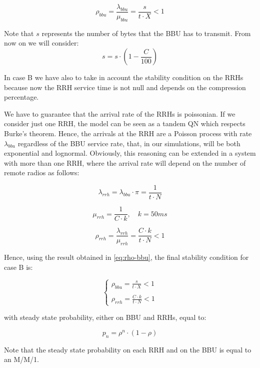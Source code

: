 \documentclass[11pt,a4paper,oneside, openright]{article}
\begin{document}
\begin{equation} \label{eq:rho-bbu}
\rho_{bbu} = \frac{\lambda_{bbu}}{\mu_{bbu}} = \frac{s}{t \cdot X} < 1
\end{equation}

Note that $s$ represents the number of bytes that the BBU has to transmit. From now on we will consider:
$$s = s\cdot(1-\frac{C}{100})$$

In case B we have also to take in account the stability condition on the RRHs because now the RRH service time is not null and depends on the compression percentage. 

We have to guarantee that the arrival rate of the RRHs is poissonian. If we consider just one RRH, the model can be seen as a tandem QN which respects Burke's theorem. Hence, the arrivals at the RRH are a Poisson process with rate $ \lambda_{bbu} $ regardless of the BBU service rate, that, in our simulations, will be both exponential and lognormal. 
Obviously, this reasoning can be extended in a system with more than one RRH, where the arrival rate will depend on the number of remote radios as follows:

$$ \lambda_{rrh} = \lambda_{bbu} \cdot \pi = \frac{1}{t \cdot N} $$

$$ \mu_{rrh} = \frac{1}{C \cdot k}, \quad k = 50ms $$

\begin{equation} \label{eq:rho-rrh}
\rho_{rrh} = \frac{\lambda_{rrh}}{\mu_{rrh}} = \frac{C \cdot k}{t \cdot N} < 1
\end{equation}

Hence, using the result obtained in \ref{eq:rho-bbu}, the final stability condition for case B is:

$$ \begin{cases} \rho_{bbu} = \frac{s}{t \cdot X} < 1 \\ \\ \rho_{rrh} = \frac{C \cdot k}{t \cdot N} < 1 \end{cases} $$

with steady state probability, either on BBU and RRHs, equal to:

$$ p_{n} = \rho^n \cdot (1 - \rho) $$

Note that the steady state probability on each RRH and on the BBU is equal to an M/M/1.

\end{document}
